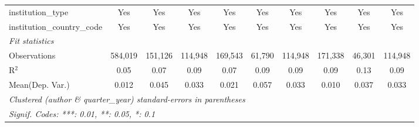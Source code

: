 \begin{tabular}{lccccccccc}
   institution\_type                      & Yes            & Yes            & Yes            & Yes            & Yes            & Yes            & Yes           & Yes            & Yes\\  
   institution\_country\_code             & Yes            & Yes            & Yes            & Yes            & Yes            & Yes            & Yes           & Yes            & Yes\\  
   \midrule
   \emph{Fit statistics}\\
   Observations                           & 584,019        & 151,126        & 114,948        & 169,543        & 61,790         & 114,948        & 171,338       & 46,301         & 114,948\\  
   R$^2$                                  & 0.05           & 0.07           & 0.09           & 0.07           & 0.09           & 0.09           & 0.09          & 0.13           & 0.09\\  
Mean(Dep. Var.) & 0.012 & 0.045 & 0.033 & 0.021 & 0.057 & 0.033 & 0.010 & 0.037 & 0.033 \\
   \midrule \midrule
   \multicolumn{10}{l}{\emph{Clustered (author \& quarter\_year) standard-errors in parentheses}}\\
   \multicolumn{10}{l}{\emph{Signif. Codes: ***: 0.01, **: 0.05, *: 0.1}}\\
\end{tabular}
\par\endgroup
